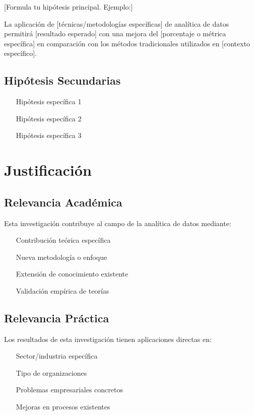 [Formula tu hipótesis principal. Ejemplo:]

La aplicación de [técnicas/metodologías específicas] de analítica de datos permitirá [resultado esperado] con una mejora del [porcentaje o métrica específica] en comparación con los métodos tradicionales utilizados en [contexto específico].

\subsection{Hipótesis Secundarias}

\begin{itemize}
    \item [Hipótesis específica 1]
    \item [Hipótesis específica 2]
    \item [Hipótesis específica 3]
\end{itemize}

\section{Justificación}

\subsection{Relevancia Académica}

Esta investigación contribuye al campo de la analítica de datos mediante:

\begin{itemize}
    \item [Contribución teórica específica]
    \item [Nueva metodología o enfoque]
    \item [Extensión de conocimiento existente]
    \item [Validación empírica de teorías]
\end{itemize}

\subsection{Relevancia Práctica}

Los resultados de esta investigación tienen aplicaciones directas en:

\begin{itemize}
    \item [Sector/industria específica]
    \item [Tipo de organizaciones]
    \item [Problemas empresariales concretos]
    \item [Mejoras en procesos existentes]
\end{itemize}


